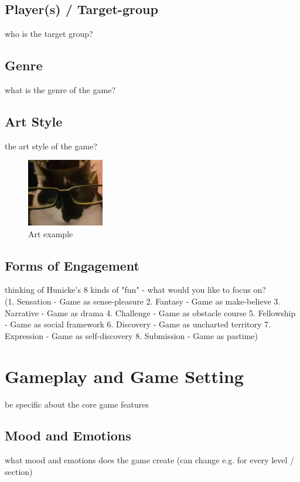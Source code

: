 \documentclass[a4paper]{scrreprt}
\begin{document}
\section{Player(s) / Target-group}
who is the target group? 

\section{Genre}
what is the genre of the game?

\section{Art Style}
the art style of the game?

\begin{figure}
\centering
\includegraphics[width=0.3\textwidth]{test.jpg}
\caption{\label{fig:art} Art example}
\end{figure}

\section{Forms of Engagement}
thinking of Hunicke's 8 kinds of "fun" - what would you like to focus on?\\
(1. Sensation - Game as sense-pleasure 
2. Fantasy - Game as make-believe
3. Narrative - Game as drama
4. Challenge - Game as obstacle course
5. Fellowship -  Game as social framework
6. Discovery - Game as uncharted territory 
7. Expression - Game as self-discovery 
8. Submission - Game as pastime)



\chapter{Gameplay and Game Setting}
be specific about the core game features 

\section{Mood and Emotions}
what mood and emotions does the game create (can change e.g. for every level / section) 
\end{document}
